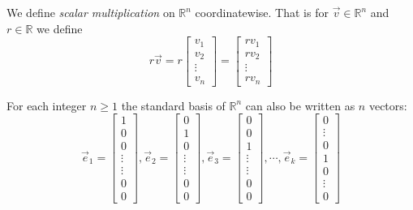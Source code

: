\begin{definition}
We define \emph{scalar multiplication} on $\mathbb{R}^n$ coordinatewise. That 
is for $\vec{v} \in \mathbb{R}^n$ and $r \in \mathbb{R}$ we define
\[
r\vec{v}=
r\begin{bmatrix}v_1\\ v_2 \\ \vdots \\ v_n\end{bmatrix}=
\begin{bmatrix}rv_1\\ rv_2 \\ \vdots \\ rv_n\end{bmatrix}
\]
\end{definition}
\begin{remark}For each integer $n\geq 1$ the standard basis of $\mathbb{R}^n$ 
can also be written as $n$ vectors:
\[
\vec{e}_{1}=\begin{bmatrix} 1 \\  0 \\ 0 \\ \vdots \\ \vdots \\ 0 \\ 0\end{bmatrix},
\vec{e}_{2}=\begin{bmatrix} 0 \\  1 \\ 0 \\ \vdots \\ \vdots \\ 0 \\ 0\end{bmatrix},
\vec{e}_{3}=\begin{bmatrix} 0 \\  0 \\ 1 \\ \vdots \\ \vdots \\ 0 \\ 0\end{bmatrix},
\cdots,
\vec{e}_k=\begin{bmatrix} 0 \\  \vdots \\ 0 \\ 1 \\ 0 \\ \vdots \\ 0 \end{bmatrix}
\]
\end{remark}
